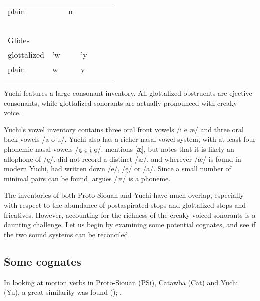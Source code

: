 \documentclass[output=paper]{LSP/langsci}
\begin{document}
\begin{table}[h!]
\begin{tabular}{llllll}
plain                       & ~                   & n                    & ~                       & ~                   & ~                \\
~                           & ~                   & ~                    & ~                       & ~                   & ~                \\
 Glides           & ~                   & ~                    & ~                       & ~                   & ~                \\
glottalized                 & 'w                  & ~                    & 'y                      & ~                   & ~                \\
plain                       & w                   & ~                    & y                       & ~                   & ~                \\ \lspbottomrule
\end{tabular}
\end{table}

Yuchi features a large consonant inventory. All glottalized obstruents are ejective consonants, while glottalized sonorants are actually pronounced with creaky voice. 

Yuchi's vowel inventory contains three oral front vowels /i e \ae/ and three oral back vowels /a o u/. Yuchi also has a richer nasal vowel system, with at least four phonemic nasal vowels /\k{a} \k{e} \k{i} \k{o}/. \citet{Linn2000} mentions [\k{\ae}], but notes that it is likely an allophone of /\k{e}/. \citet{Wagner1934} did not record a distinct /\ae/, and wherever /\ae/ is found in modern Yuchi, \citet{Wagner1934} had written down /e/, /\k{e}/ or /a/. Since a small number of minimal pairs can be found, \citet[44]{Linn2000} argues /\ae/ is a phoneme.

The inventories of both Proto-Siouan and Yuchi have much overlap, especially with respect to the abundance of postaspirated stops and glottalized stops and fricatives. However, accounting for the richness of the creaky-voiced sonorants is a daunting challenge. Let us begin by examining some potential cognates, and see if the two sound systems can be reconciled.

\subsection{Some cognates}
 
In looking at motion verbs in Proto-Siouan (PSi), Catawba (Cat) and Yuchi (Yu), a great similarity was found (\citealt{Kasak2013}); .
\end{document}
